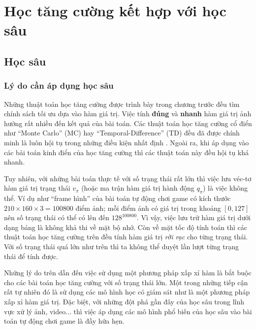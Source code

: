 \section{Học tăng cường kết hợp với học sâu}

\subsection{Học sâu}
\subsubsection*{Lý do cần áp dụng học sâu}
	Những thuật toán học tăng cường được trình bày trong chương trước đều tìm chính sách tối ưu dựa vào hàm giá trị. 
	Việc tính \textbf{đúng} và \textbf{nhanh} hàm giá trị ảnh hưởng rất nhiều đến kết quả của bài toán. 
	Các thuật toán học tăng cường cổ điển như ``Monte Carlo'' (MC) hay ``Temporal-Difference'' (TD) đều đã được chính minh là luôn hội tụ trong những điều kiện nhất định \cite{sutton1998introduction}. 
	Ngoài ra, khi áp dụng vào các bài toán kinh điển của học tăng cường thì các thuật toán này đều hội tụ khá nhanh.
	
	Tuy nhiên, với những bài toán thực tế với số trạng thái rất lớn thì việc lưu véc-tơ hàm giá trị trạng thái $v_{\pi}$ (hoặc ma trận hàm giá trị hành động $q_{\pi}$) là việc không thể. 
	Ví dụ như ``frame hình'' của bài toán tự động chơi game có kích thước $210\times160\times3=100800$ điểm ảnh; mỗi điểm ảnh có giá trị trong khoảng $[0, 127]$ nên số trạng thái có thể có lên đến $128^{100800}$.
	Vì vậy, việc lưu trữ hàm giá trị dưới dạng bảng là không khả thi về mặt bộ nhớ.
	Còn về mặt tốc độ tính toán thì các thuật toán học tăng cường trên đều tính hàm giá trị \textit{rời rạc} cho từng trạng thái.
	Với số trạng thái quá lớn như trên thì ta không thể duyệt lần lượt từng trạng thái để tính được.
	
	Những lý do trên dẫn đến việc sử dụng một phương pháp xấp xỉ hàm là bắt buộc cho các bài toán học tăng cường với số trạng thái lớn.
	Một trong những tiếp cận rất tự nhiên đó là sử dụng các mô hình học có giám sát như là một phương pháp xấp xỉ hàm giá trị.
	Đặc biệt, với những đột phá gần đây của học sâu trong lĩnh vực xử lý ảnh, video... thì việc áp dụng các mô hình phổ biến của học sâu vào bài toán tự động chơi game là đầy hứa hẹn.
	
